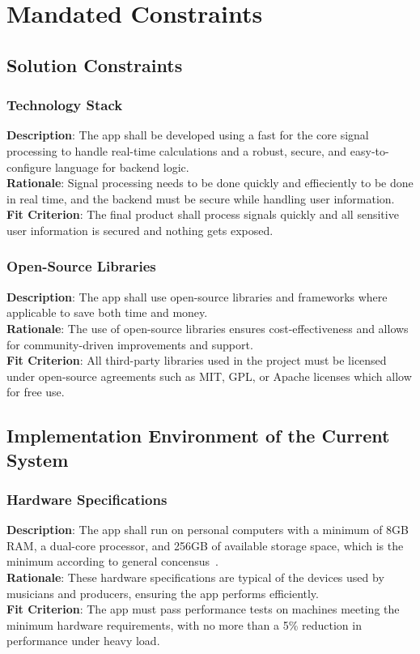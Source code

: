 \documentclass[12pt]{article}
\begin{document}
\section{Mandated Constraints}
\subsection{Solution Constraints}
\subsubsection*{Technology Stack}
\textbf{Description}: The app shall be developed using a fast for the core signal processing to handle real-time calculations and a robust, secure, and easy-to-configure language for backend logic.\\
\textbf{Rationale}: Signal processing needs to be done quickly and effieciently to be done in real time, and the backend must be secure while handling user information.\\
\textbf{Fit Criterion}: The final product shall process signals quickly and all sensitive user information is secured and nothing gets exposed.
\subsubsection*{Open-Source Libraries}
\textbf{Description}: The app shall use open-source libraries and frameworks where applicable to save both time and money.\\
\textbf{Rationale}: The use of open-source libraries ensures cost-effectiveness and allows for community-driven improvements and support.\\
\textbf{Fit Criterion}: All third-party libraries used in the project must be licensed under open-source agreements such as MIT, GPL, or Apache licenses which allow for free use.

\subsection{Implementation Environment of the Current System}
\subsubsection*{Hardware Specifications}
\textbf{Description}: The app shall run on personal computers with a minimum of 8GB RAM, a dual-core processor, and 256GB of available storage space, which is the minimum according to general concensus~\cite{music-specs}.\\
\textbf{Rationale}: These hardware specifications are typical of the devices used by musicians and producers, ensuring the app performs efficiently.\\
\textbf{Fit Criterion}: The app must pass performance tests on machines meeting the minimum hardware requirements, with no more than a 5\% reduction in performance under heavy load.
\end{document}
